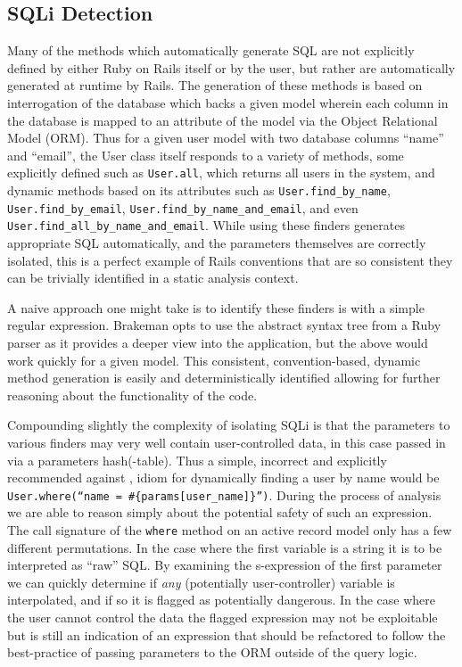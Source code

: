 \documentclass[conference]{IEEEtran}
\begin{document}
\subsection{SQLi Detection}

Many of the methods which automatically generate SQL are not explicitly defined
by either Ruby on Rails itself or by the user, but rather are automatically generated at
runtime by Rails.  The generation of these methods is based on interrogation of the
database which backs a given model wherein each column in the database is mapped to an
attribute of the model via the Object Relational Model (ORM).  Thus for a given user model
with two database columns ``name'' and ``email'', the User class itself responds to a
variety of methods, some explicitly defined such as \texttt{User.all}, which returns all
users in the system, and dynamic methods based on its attributes such as
\texttt{User.find\_by\_name}, \texttt{User.find\_by\_email},
\texttt{User.find\_by\_name\_and\_email}, and even
\texttt{User.find\_all\_by\_name\_and\_email}.  While using these finders generates
appropriate SQL automatically, and the parameters themselves are correctly isolated, this
is a perfect example of Rails conventions that are so consistent they can be trivially
identified in a static analysis context.

A naive approach one might take is to identify these finders is with a simple regular
expression.  Brakeman opts to use the abstract syntax tree from a Ruby parser as it
provides a deeper view into the application, but the above would work quickly for a given
model.  This consistent, convention-based, dynamic method generation is easily and
deterministically identified allowing for further reasoning about the functionality of the
code.

Compounding slightly the complexity of isolating SQLi is that the parameters to various
finders may very well contain user-controlled data, in this case passed in via a
parameters hash(-table).  Thus a simple, incorrect and explicitly recommended against
\cite{rails_security}, idiom for dynamically
finding a user by name would be \texttt{User.where(``name~=~\#\{params[user\_name]\}'')}.
During the process of analysis we are able to reason simply about the
potential safety of such an expression.  The call signature of the
\texttt{where} method on an active record model only has a few different
permutations.  In the case where the first variable is a string it is to be
interpreted as ``raw'' SQL.  By examining the s-expression of the first
parameter we can quickly determine if \emph{any} (potentially user-controller)
variable is interpolated, and if so it is flagged as potentially dangerous.  In
the case where the user cannot control the data the flagged expression may not
be exploitable but is still an indication of an expression that should be
refactored to follow the best-practice of passing parameters to the ORM outside
of the query logic\cite{rails_security_sqli}.
\end{document}
